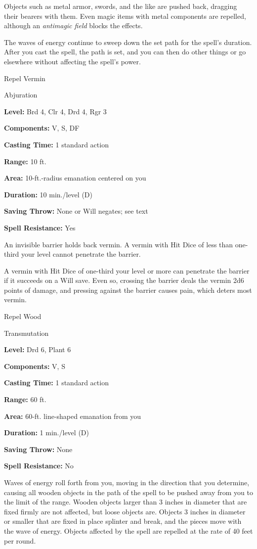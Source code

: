 \documentclass{article}
\begin{document}
Objects such as metal armor, swords, and the like are pushed back, dragging their 
bearers with them. Even magic items with metal components are repelled, although 
an \textit{antimagic field }blocks the effects.

The waves of energy continue to sweep down the set path for the spell's duration. 
After you cast the spell, the path is set, and you can then do other things or 
go elsewhere without affecting the spell's power.

\vspace{12pt}
Repel Vermin

Abjuration

\textbf{Level:} Brd 4, Clr 4, Drd 4, Rgr 3

\textbf{Components:} V, S, DF

\textbf{Casting Time:} 1 standard action

\textbf{Range:} 10 ft.

\textbf{Area:} 10-ft.-radius emanation centered on you

\textbf{Duration:} 10 min./level (D)

\textbf{Saving Throw:} None or Will negates; see text

\textbf{Spell Resistance:} Yes

An invisible barrier holds back vermin. A vermin with Hit Dice of less than one-third 
your level cannot penetrate the barrier.

A vermin with Hit Dice of one-third your level or more can penetrate the barrier 
if it succeeds on a Will save. Even so, crossing the barrier deals the vermin 2d6 
points of damage, and pressing against the barrier causes pain, which deters most 
vermin.

\vspace{12pt}
Repel Wood

Transmutation

\textbf{Level:} Drd 6, Plant 6

\textbf{Components:} V, S

\textbf{Casting Time:} 1 standard action

\textbf{Range:} 60 ft.

\textbf{Area:} 60-ft. line-shaped emanation from you

\textbf{Duration:} 1 min./level (D)

\textbf{Saving Throw:} None

\textbf{Spell Resistance:} No

Waves of energy roll forth from you, moving in the direction that you determine, 
causing all wooden objects in the path of the spell to be pushed away from you 
to the limit of the range. Wooden objects larger than 3 inches in diameter that 
are fixed firmly are not affected, but loose objects are. Objects 3 inches in diameter 
or smaller that are fixed in place splinter and break, and the pieces move with 
the wave of energy. Objects affected by the spell are repelled at the rate of 40 
feet per round.
\end{document}
